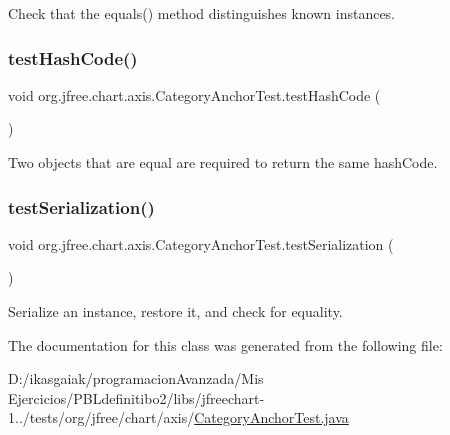 Check that the equals() method distinguishes known instances. \mbox{\label{classorg_1_1jfree_1_1chart_1_1axis_1_1_category_anchor_test_aba90f5727afd590697aebb4ddde8aee3}} 
\subsubsection{\texorpdfstring{test\+Hash\+Code()}{testHashCode()}}
{\footnotesize\ttfamily void org.\+jfree.\+chart.\+axis.\+Category\+Anchor\+Test.\+test\+Hash\+Code (\begin{DoxyParamCaption}{ }\end{DoxyParamCaption})}

Two objects that are equal are required to return the same hash\+Code. \mbox{\label{classorg_1_1jfree_1_1chart_1_1axis_1_1_category_anchor_test_aa597c79b5478b21ee4838cd8c1e6e033}} 
\subsubsection{\texorpdfstring{test\+Serialization()}{testSerialization()}}
{\footnotesize\ttfamily void org.\+jfree.\+chart.\+axis.\+Category\+Anchor\+Test.\+test\+Serialization (\begin{DoxyParamCaption}{ }\end{DoxyParamCaption})}

Serialize an instance, restore it, and check for equality. 

The documentation for this class was generated from the following file\+:\begin{DoxyCompactItemize}
\item 
D\+:/ikasgaiak/programacion\+Avanzada/\+Mis Ejercicios/\+P\+B\+Ldefinitibo2/libs/jfreechart-\/1../tests/org/jfree/chart/axis/\mbox{\hyperlink{_category_anchor_test_8java}{Category\+Anchor\+Test.\+java}}\end{DoxyCompactItemize}
